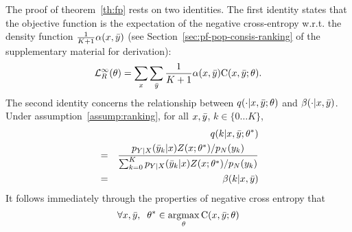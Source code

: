 \documentclass[11pt,a4paper]{article}
\DeclareMathOperator{\E}{\mathbb{E}}
\newcommand{\objr}{{\cal L}_R^n}
\newcommand{\objri}{{\cal L}_R^{\infty}}
\DeclareMathOperator*{\argmax}{argmax}
\newcommand{\commentout}[1]{}
\begin{document}
\commentout{
Thus $q(\ldots; \theta)$ is a distribution under parameters $\theta$,
$\beta(\ldots)$ is a distribution under the true underlying distribution,
and $\ce(\ldots)$ is the negative cross entropy between these two
distributions.}

\commentout{
The proof of theorem~\ref{th:fp} rests on two identities.
Note that $\objr(\theta) = \frac{1}{n} \sum_{i=1}^n \log q(0 | x^{(i)}, \bary^{(i)}; \theta)$.
The first identity is as follows:
\begin{small}
\begin{eqnarray}
&&\hbox{$\;$\hspace{-1cm}$\;$} \objri(\theta) = \E[L^n_R(\theta)] \nonumber\\
& \hbox{$\;$\hspace{-1cm}$\;$}=& \sum_x \sum_{\bary} p(x, \bary_0) \prod_{k=1}^K p_N(\bary_k) \log q(0 | x, \bary; \theta) \label{eq:ei1}\\
& \hbox{$\;$\hspace{-1cm}$\;$}=& \frac{1}{K + 1} \sum_x \sum_{\bary} \alpha(x, \bary) \ce(x, \bary; \theta)
\label{eq:hr}
\end{eqnarray}
\end{small}
Eq.~\ref{eq:ei1} follows because
each pair $x^{(i)}, \bary^{(i)}$ is drawn from the distribution
$
p_{X,\bar{Y}}(x, \bary) = p_{X,Y}(x, \bary_0) \prod_{k=1}^K p_N(\bary_k)
$. Eq.~\ref{eq:hr} follows through algebraic manipulations.
}


The proof of theorem~\ref{th:fp} rests on two identities. The first identity states that the objective function is the expectation of the negative cross-entropy w.r.t. the density function $\frac{1}{K + 1} \alpha(x, \bar{y})$ (see Section~\ref{sec:pf-pop-consis-ranking} of the supplementary material for derivation):
\begin{eqnarray}
 \objri(\theta) =  \sum_x \sum_{\bary} \frac{1}{K + 1} \alpha(x, \bary) \ce(x, \bary; \theta).
\label{eq:hr}
\end{eqnarray}
The second identity concerns the relationship between $q(\cdot |x, \bar{y}; \theta)$
and $\beta(\cdot | x, \bar{y})$.  Under assumption~\ref{assump:ranking}, for all $x, \bar{y}$, $k \in \{0 \ldots K\}$,
\begin{eqnarray}
&&q(k | x, \bar{y}; \theta^*) \nonumber \\
&=& \frac{p_{Y|X}(\bar{y}_k | x) Z(x; \theta^*)/{p_N(y_k)}}{\sum_{k=0}^K
    p_{Y|X}(\bar{y}_k | x) Z(x; \theta^*)/{p_N(y_k)}} \nonumber \\
&=& \beta(k | x, \bar{y}) \label{eq:beta}
\end{eqnarray}
It follows immediately through the properties of negative cross entropy that
\begin{equation}
\forall x, \bary, \;\;
\theta^* \in \argmax_\theta \ce(x, \bary; \theta)
\label{eq:ts}
\end{equation}
\end{document}
